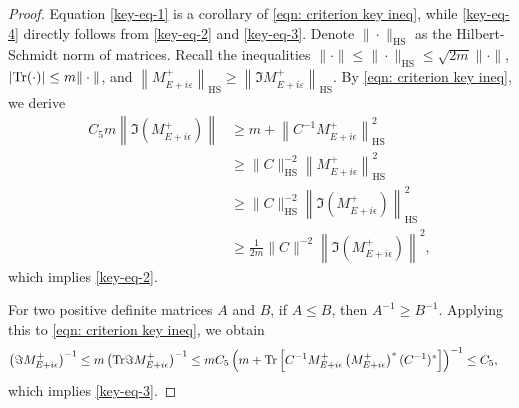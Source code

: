 \documentclass[11pt]{amsart}
\theoremstyle{remark}
\theoremstyle{definition}
\newcommand{\tr}{{\rm Tr}}
\begin{document}
\begin{proof}
Equation \eqref{key-eq-1} is a corollary of \eqref{eqn: criterion key ineq}, while \eqref{key-eq-4} directly follows from \eqref{key-eq-2} and \eqref{key-eq-3}.  Denote $\|\cdot\|_{\text{HS}}$ as the Hilbert-Schmidt norm of matrices. Recall the inequalities $\|\cdot\| \leq \|\cdot\|_{\text{HS}} \leq \sqrt{2m} \|\cdot\|$, $|\tr(\cdot)| \leq m \|\cdot\|$, and $\left\|M_{E+i\varepsilon}^+\right\|_{\text{HS}} \geq \left\|\Im M_{E+i\varepsilon}^+\right\|_{\text{HS}}$. By \eqref{eqn: criterion key ineq}, we derive
\begin{align*}
C_5 m \left\|\Im \left(M^+_{E+i\epsilon}\right)\right\| &\geq m + \left\|C^{-1} M^+_{E+i\epsilon}\right\|_{\text{HS}}^2 \nonumber \\
&\geq \|C\|_{\text{HS}}^{-2} \left\|M^+_{E+i\epsilon}\right\|_{\text{HS}}^2 \nonumber \\
&\geq \|C\|_{\text{HS}}^{-2} \left\|\Im \left(M^+_{E+i\epsilon}\right)\right\|_{\text{HS}}^2 \nonumber \\
&\geq \frac{1}{2m} \|C\|^{-2} \left\|\Im \left(M^+_{E+i\epsilon}\right)\right\|^2,
\end{align*}
which implies \eqref{key-eq-2}.

For two positive definite matrices $A$ and $B$, if $A \leq B$, then $A^{-1} \geq B^{-1}$. Applying this to \eqref{eqn: criterion key ineq}, we obtain
\begin{align*}
\left(\Im M^+_{E+i\epsilon}\right)^{-1} &\leq m \left(\tr \Im M^+_{E+i\epsilon}\right)^{-1} 
\leq m C_5 \left(m + \tr\left[C^{-1} M_{E+i\epsilon}^+ \left(M_{E+i\epsilon}^+\right)^\ast (C^{-1})^\ast\right]\right)^{-1} 
\leq C_5,
\end{align*}
which implies \eqref{key-eq-3}.
\end{proof}
\end{document}
